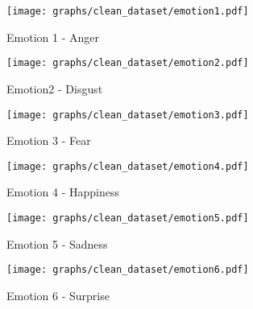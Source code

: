 \begin{figure}[!ht]
\center
	\caption{Emotion 1 - Anger}  
	\texttt{[image: graphs/clean\_dataset/emotion1.pdf]}
	 
	
   \label{fig:decisionTrees1}
\end{figure}

\begin{figure}[!ht]
\center
	\caption{Emotion2 - Disgust}  
	\texttt{[image: graphs/clean\_dataset/emotion2.pdf]}
	 
	
   \label{fig:decisionTrees2}
\end{figure}

\begin{figure}[!ht]
\center
	\caption{Emotion 3 - Fear}  
	\texttt{[image: graphs/clean\_dataset/emotion3.pdf]}
	 
	
   \label{fig:decisionTrees3}
\end{figure}

\begin{figure}[!ht]
\center
	\caption{Emotion 4 - Happiness}  
	\texttt{[image: graphs/clean\_dataset/emotion4.pdf]}
	 
	
   \label{fig:decisionTrees4}
\end{figure}

\begin{figure}[!ht]
\center
	\caption{Emotion 5 - Sadness}  
	\texttt{[image: graphs/clean\_dataset/emotion5.pdf]}
	 
	
   \label{fig:decisionTrees5}
\end{figure}

\begin{figure}[!ht]
\center
	\caption{Emotion 6 - Surprise}  
	\texttt{[image: graphs/clean\_dataset/emotion6.pdf]}
	 
	
   \label{fig:decisionTrees6}
\end{figure}
